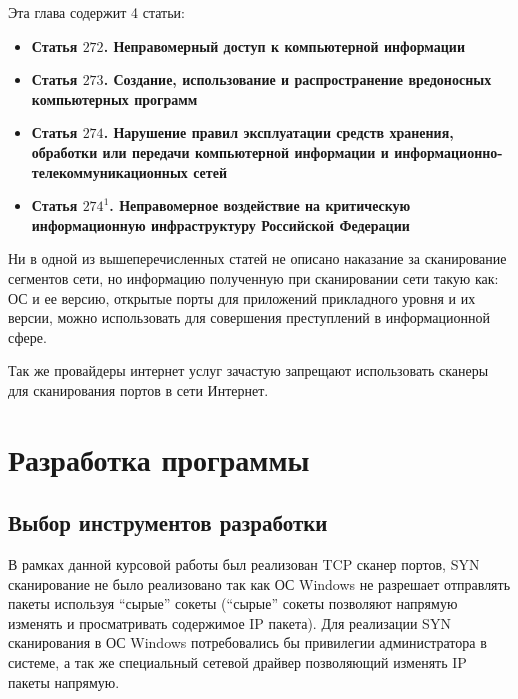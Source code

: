 Эта глава содержит 4 статьи:

\begin{itemize}
\tightlist
\item
  \textbf{Статья \(272\). Неправомерный доступ к компьютерной
  информации}
\item
  \textbf{Статья \(273\). Создание, использование и распространение
  вредоносных компьютерных программ}
\item
  \textbf{Статья \(274\). Нарушение правил эксплуатации средств
  хранения, обработки или передачи компьютерной информации и
  информационно-телекоммуникационных сетей}
\item
  \textbf{Статья \(274^1\). Неправомерное воздействие на критическую
  информационную инфраструктуру Российской Федерации}
\end{itemize}

Ни в одной из вышеперечисленных статей не описано наказание за
сканирование сегментов сети, но информацию полученную при сканировании
сети такую как: ОС и ее версию, открытые порты для приложений
прикладного уровня и их версии, можно использовать для совершения
преступлений в информационной сфере.

Так же провайдеры интернет услуг зачастую запрещают использовать сканеры
для сканирования портов в сети Интернет.

\hypertarget{ux440ux430ux437ux440ux430ux431ux43eux442ux43aux430-ux43fux440ux43eux433ux440ux430ux43cux43cux44b}{%
\section{Разработка
программы}\label{ux440ux430ux437ux440ux430ux431ux43eux442ux43aux430-ux43fux440ux43eux433ux440ux430ux43cux43cux44b}}

\hypertarget{ux432ux44bux431ux43eux440-ux438ux43dux441ux442ux440ux443ux43cux435ux43dux442ux43eux432-ux440ux430ux437ux440ux430ux431ux43eux442ux43aux438}{%
\subsection{Выбор инструментов
разработки}\label{ux432ux44bux431ux43eux440-ux438ux43dux441ux442ux440ux443ux43cux435ux43dux442ux43eux432-ux440ux430ux437ux440ux430ux431ux43eux442ux43aux438}}

В рамках данной курсовой работы был реализован TCP сканер портов, SYN
сканирование не было реализовано так как ОС Windows не разрешает
отправлять пакеты используя ``сырые'' сокеты (``сырые'' сокеты позволяют
напрямую изменять и просматривать содержимое IP пакета). Для реализации
SYN сканирования в ОС Windows потребовались бы привилегии администратора
в системе, а так же специальный сетевой драйвер позволяющий изменять IP
пакеты напрямую.


